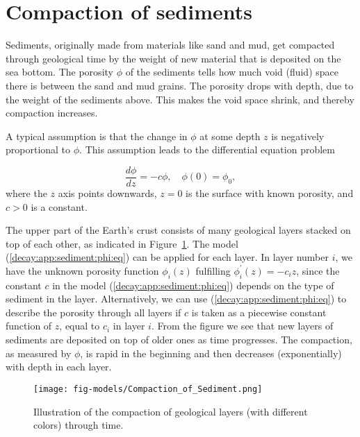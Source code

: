 \documentclass[graybox,sectrefs,envcountresetchap,open=right,final]{svmonodo}
\begin{document}
\section{Compaction of sediments}
\label{decay:app:sediment}

Sediments, originally made from materials like sand and mud, get
compacted through geological time by the weight of new material that
is deposited on the sea bottom. The porosity $\phi$ of the sediments
tells how much void (fluid) space there is between the sand and
mud grains. The porosity drops with depth, due to the weight of
the sediments above. This makes the void space shrink, and thereby compaction
increases.

A typical assumption is that the change in $\phi$ at some depth $z$
is negatively proportional to $\phi$. This assumption leads to
the differential equation problem

\begin{equation}
\frac{d\phi}{dz} = -c\phi,\quad \phi(0)=\phi_0,
\label{decay:app:sediment:phi:eq}
\end{equation}
where the $z$ axis points downwards, $z=0$ is the surface with known
porosity, and $c>0$ is a constant.

The upper part of the Earth's crust consists of many geological layers
stacked on top of each other, as indicated in Figure~\ref{decay:app:sediment:fig:layers}.  The model
(\ref{decay:app:sediment:phi:eq}) can be applied for each layer. In
layer number $i$, we have the unknown porosity function $\phi_i(z)$
fulfilling $\phi_i^{\prime}(z)=-c_iz$, since the constant $c$ in the model
(\ref{decay:app:sediment:phi:eq}) depends on the type of sediment in
the layer. Alternatively, we can use (\ref{decay:app:sediment:phi:eq})
to describe the porosity through all layers if $c$ is taken as a
piecewise constant function of $z$, equal to $c_i$ in layer $i$.
From the figure we see that new layers of sediments are
deposited on top of older ones as time progresses. The compaction,
as measured by $\phi$, is
rapid in the beginning and then decreases (exponentially) with depth
in each layer.

\begin{figure}[!ht]  %
  \centerline{\texttt{[image: fig-models/Compaction\_of\_Sediment.png]}}
  \caption{
  Illustration of the compaction of geological layers (with different colors) through time. \label{decay:app:sediment:fig:layers}
  }
\end{figure}
\end{document}
